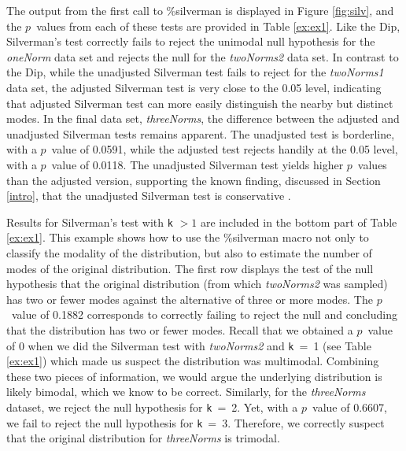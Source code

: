 \documentclass[]{interact}
\theoremstyle{plain}%
\theoremstyle{definition}
\theoremstyle{remark}
\begin{document}
The output from the first call to \%silverman is displayed in Figure \ref{fig:silv}, and the $p$~values from each of these tests are provided in Table \ref{ex:ex1}. Like the Dip, Silverman's test correctly fails to reject the unimodal null hypothesis for the \textit{oneNorm} data set and rejects the null for the \textit{twoNorms2} data set. %
In contrast to the Dip, while the unadjusted Silverman test fails to reject for the \textit{twoNorms1} data set, the adjusted Silverman test is very close to the 0.05 level, indicating that adjusted Silverman test can more easily distinguish the nearby but distinct modes. %
 In the final data set, \textit{threeNorms}, the difference between the adjusted and unadjusted Silverman tests remains apparent. The unadjusted test is borderline, with a $p$~value of 0.0591, while the adjusted test rejects handily at the 0.05 level, with a $p$~value of 0.0118. The unadjusted Silverman test yields higher $p$~values than the adjusted version, supporting the known finding, discussed in Section \ref{intro}, that the unadjusted Silverman test is conservative \citep{hall2001calibration}.



Results for Silverman's test with \texttt{k} $> 1$ are included in the bottom part of Table \ref{ex:ex1}. This example shows how to use the \%silverman macro not only to classify the modality of the distribution, but also %
to estimate the number of modes of the original distribution. %
The first row displays the test of the null hypothesis that the original distribution (from which \textit{twoNorms2} was sampled) has two or fewer modes against the alternative of three or more modes. The $p$~value of 0.1882 corresponds to correctly failing to reject the null and concluding that the distribution has two or fewer modes. Recall that we obtained a $p$~value of 0 when we did the Silverman test with \textit{twoNorms2} and \texttt{k}~=~1 (see Table \ref{ex:ex1}) which made us suspect the distribution was multimodal. Combining these two pieces of information, we would argue the underlying distribution is likely bimodal, which we know to be correct. 
Similarly, for the \textit{threeNorms} dataset, %
we reject the null hypothesis for \texttt{k}~=~2. Yet, with a $p$~value of 0.6607, we fail to reject the null hypothesis for \texttt{k}~=~3. Therefore, we correctly suspect that the original distribution for \textit{threeNorms} is trimodal.%
\end{document}
